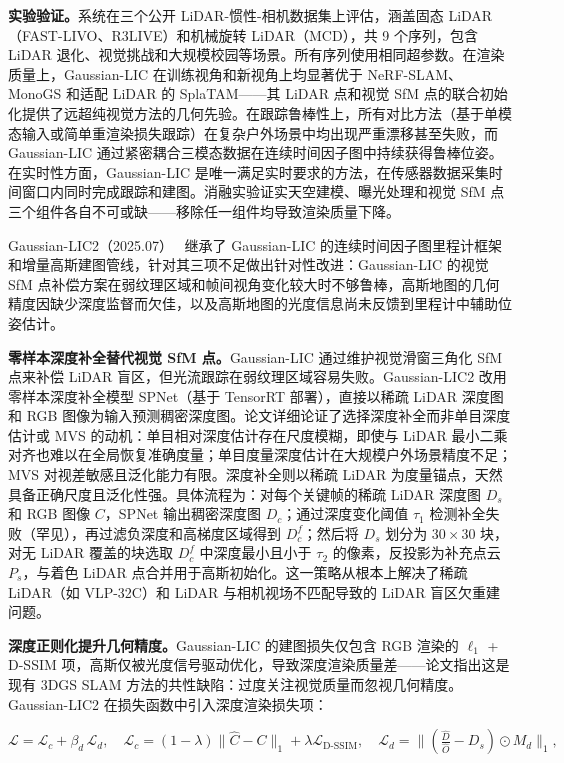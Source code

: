 \textbf{实验验证。}系统在三个公开 LiDAR-惯性-相机数据集上评估，涵盖固态 LiDAR（FAST-LIVO、R3LIVE）和机械旋转 LiDAR（MCD），共 9 个序列，包含 LiDAR 退化、视觉挑战和大规模校园等场景。所有序列使用相同超参数。在渲染质量上，Gaussian-LIC 在训练视角和新视角上均显著优于 NeRF-SLAM、MonoGS 和适配 LiDAR 的 SplaTAM——其 LiDAR 点和视觉 SfM 点的联合初始化提供了远超纯视觉方法的几何先验。在跟踪鲁棒性上，所有对比方法（基于单模态输入或简单重渲染损失跟踪）在复杂户外场景中均出现严重漂移甚至失败，而 Gaussian-LIC 通过紧密耦合三模态数据在连续时间因子图中持续获得鲁棒位姿。在实时性方面，Gaussian-LIC 是唯一满足实时要求的方法，在传感器数据采集时间窗口内同时完成跟踪和建图。消融实验证实天空建模、曝光处理和视觉 SfM 点三个组件各自不可或缺——移除任一组件均导致渲染质量下降。

Gaussian-LIC2（2025.07）~\cite{2507_04004} 继承了 Gaussian-LIC 的连续时间因子图里程计框架和增量高斯建图管线，针对其三项不足做出针对性改进：Gaussian-LIC 的视觉 SfM 点补偿方案在弱纹理区域和帧间视角变化较大时不够鲁棒，高斯地图的几何精度因缺少深度监督而欠佳，以及高斯地图的光度信息尚未反馈到里程计中辅助位姿估计。

\textbf{零样本深度补全替代视觉 SfM 点。}Gaussian-LIC 通过维护视觉滑窗三角化 SfM 点来补偿 LiDAR 盲区，但光流跟踪在弱纹理区域容易失败。Gaussian-LIC2 改用零样本深度补全模型 SPNet（基于 TensorRT 部署），直接以稀疏 LiDAR 深度图和 RGB 图像为输入预测稠密深度图。论文详细论证了选择深度补全而非单目深度估计或 MVS 的动机：单目相对深度估计存在尺度模糊，即使与 LiDAR 最小二乘对齐也难以在全局恢复准确度量；单目度量深度估计在大规模户外场景精度不足；MVS 对视差敏感且泛化能力有限。深度补全则以稀疏 LiDAR 为度量锚点，天然具备正确尺度且泛化性强。具体流程为：对每个关键帧的稀疏 LiDAR 深度图 $D_s$ 和 RGB 图像 $C$，SPNet 输出稠密深度图 $D_c$；通过深度变化阈值 $\tau_1$ 检测补全失败（罕见），再过滤负深度和高梯度区域得到 $D_c^f$；然后将 $D_s$ 划分为 $30\times 30$ 块，对无 LiDAR 覆盖的块选取 $D_c^f$ 中深度最小且小于 $\tau_2$ 的像素，反投影为补充点云 $P_s$，与着色 LiDAR 点合并用于高斯初始化。这一策略从根本上解决了稀疏 LiDAR（如 VLP-32C）和 LiDAR 与相机视场不匹配导致的 LiDAR 盲区欠重建问题。

\textbf{深度正则化提升几何精度。}Gaussian-LIC 的建图损失仅包含 RGB 渲染的 $\ell_1$ + D-SSIM 项，高斯仅被光度信号驱动优化，导致深度渲染质量差——论文指出这是现有 3DGS SLAM 方法的共性缺陷：过度关注视觉质量而忽视几何精度。Gaussian-LIC2 在损失函数中引入深度渲染损失项：

\begin{equation}
\mathcal{L} = \mathcal{L}_c + \beta_d\,\mathcal{L}_d, \quad \mathcal{L}_c = (1-\lambda)\|\hat{C} - C\|_1 + \lambda \mathcal{L}_{\text{D-SSIM}}, \quad \mathcal{L}_d = \|(\tfrac{\hat{D}}{\hat{O}} - D_s)\odot M_d\|_1,
\end{equation}

